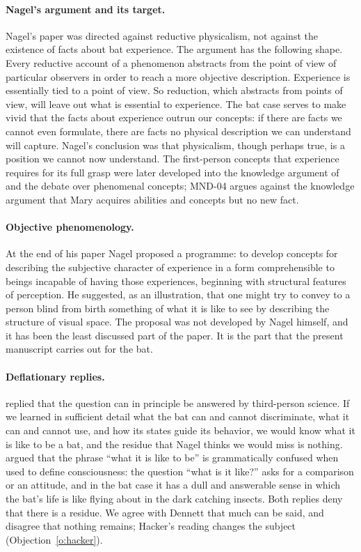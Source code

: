 \documentclass{situationist-preprint}
\begin{document}
\paragraph{Nagel's argument and its target.} Nagel's paper was directed against reductive physicalism, not against the existence of facts about bat experience. The argument has the following shape. Every reductive account of a phenomenon abstracts from the point of view of particular observers in order to reach a more objective description. Experience is essentially tied to a point of view. So reduction, which abstracts from points of view, will leave out what is essential to experience. The bat case serves to make vivid that the facts about experience outrun our concepts: if there are facts we cannot even formulate, there are facts no physical description we can understand will capture. Nagel's conclusion was that physicalism, though perhaps true, is a position we cannot now understand. The first-person concepts that experience requires for its full grasp were later developed into the knowledge argument of \citet{Jackson1982} and the debate over phenomenal concepts; MND-04 argues against the knowledge argument that Mary acquires abilities and concepts but no new fact.

\paragraph{Objective phenomenology.} At the end of his paper Nagel proposed a programme: to develop concepts for describing the subjective character of experience in a form comprehensible to beings incapable of having those experiences, beginning with structural features of perception. He suggested, as an illustration, that one might try to convey to a person blind from birth something of what it is like to see by describing the structure of visual space. The proposal was not developed by Nagel himself, and it has been the least discussed part of the paper. It is the part that the present manuscript carries out for the bat.

\paragraph{Deflationary replies.} \citet[ch.~14]{Dennett1991} replied that the question can in principle be answered by third-person science. If we learned in sufficient detail what the bat can and cannot discriminate, what it can and cannot use, and how its states guide its behavior, we would know what it is like to be a bat, and the residue that Nagel thinks we would miss is nothing. \citet{Hacker2002} argued that the phrase \enquote{what it is like to be} is grammatically confused when used to define consciousness: the question \enquote{what is it like?} asks for a comparison or an attitude, and in the bat case it has a dull and answerable sense in which the bat's life is like flying about in the dark catching insects. Both replies deny that there is a residue. We agree with Dennett that much can be said, and disagree that nothing remains; Hacker's reading changes the subject (Objection~\ref{o:hacker}).
\end{document}

